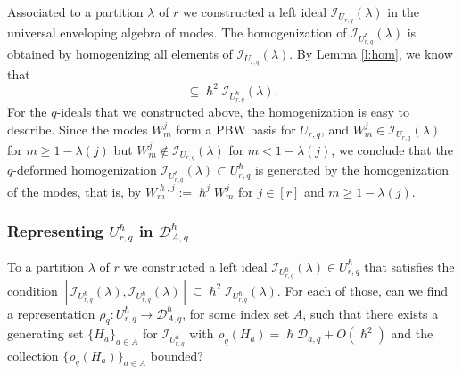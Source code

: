 \documentclass[reqno,11pt]{amsart}
\theoremstyle{plain}
\theoremstyle{definition}
\theoremstyle{remark}
\numberwithin{equation}{section}
\newcommand{\1}{\mathds{1}}
\newcommand{\2}{\frac{1}{2}}
\begin{document}
{				Associated to a partition $\lambda$ of $r$ we constructed a left ideal $\mathcal{I}_{U_{r,q}}(\lambda)$ in the universal enveloping algebra of modes. The homogenization of $\mathcal{I}_{U^\hslash_{r,q}}(\lambda)$ is obtained by homogenizing all elements of $\mathcal{I}_{U_{r,q}}(\lambda)$. By Lemma \ref{l:hom}, we know that
				\begin{equation}
					[ \mathcal{I}_{U^\hslash_{r,q}}(\lambda), \mathcal{I}^\hslash_{U_{r,q}}(\lambda)] \subseteq \hslash^2 \mathcal{I}_{U^\hslash_{r,q}}(\lambda).
				\end{equation}
				For the  $q$-ideals that we constructed above, the homogenization is easy to describe. Since the modes $W^j_m$ form a PBW basis for $U_{r,q}$, and $W^j_m \in \mathcal{I}_{U_{r,q}}(\lambda)$ for $m \geq 1- \lambda(j)$ but $W^j_m \notin \mathcal{I}_{U_{r,q}}(\lambda)$ for $m < 1- \lambda(j)$, we conclude that the $q$-deformed  homogenization $\mathcal{I}_{U^\hslash_{r,q}}(\lambda) \subset U^\hslash_{r,q}$ is generated by the homogenization of the modes, that is, by $W^{\hslash,j}_m := \hslash^j W^j_m$ for $j \in [r]$ and $m \geq  1-\lambda(j)$. 
				\subsubsection{Representing $U^\hslash_{r,q}$ in $\mathcal{D}_{A,q}^\hslash$}\label{ssr}
				
				To a partition $\lambda$ of $r$ we constructed a left ideal $ \mathcal{I}_{U_{r,q}^\hslash}(\lambda) \in U^\hslash_{r,q}$ that satisfies the condition $[ \mathcal{I}_{U_{r,q}^\hslash}(\lambda), \mathcal{I}_{U_{r,q}^\hslash}(\lambda)] \subseteq \hslash^2 \mathcal{I}_{U_{r,q}^\hslash}(\lambda)$. For each of those, can we find a representation  $\rho_q: U^\hslash_{r,q} \to \mathcal{D}_{A,q}^\hslash$, for some index set $A$, such that there exists a  generating set $\{H_a\}_{a \in A}$ for $\mathcal{I}_{U^\hslash_{r,q}}$ with $\rho_q(H_a) = \hslash \mathcal{D}_{a,q} + O(\hslash^2)$ and the collection $\{\rho_q(H_a)\}_{a \in A}$ bounded?
				
}
\end{document}
